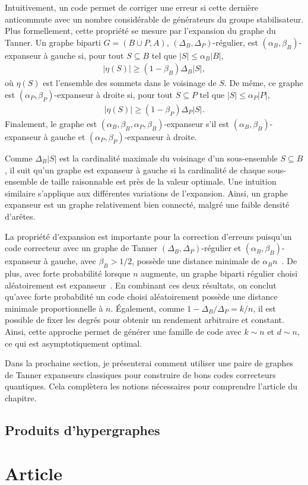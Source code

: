 Intuitivement,
un code permet de corriger une erreur si cette dernière anticommute avec un nombre 
considérable de générateurs du groupe stabilisateur.
Plus formellement,
cette propriété se mesure par l'expansion du graphe du Tanner.
Un graphe biparti $G = (B\cup P, A)$, $(\Delta_B, \Delta_P)$-régulier,
est $(\alpha_B, \beta_B)$-expanseur à gauche si,
pour tout $S \subseteq B$ tel que $|S| \leq \alpha_B |B|$,
\begin{align}
	|\eta(S)| \geq (1 - \beta_B) \Delta_B |S|,
\end{align}
où $\eta(S)$ est l'ensemble des sommets dans le voisinage de $S$.
De même,
ce graphe est $(\alpha_P, \beta_P)$-expanseur à droite si,
pour tout $S \subseteq P$ tel que $|S| \leq \alpha_P |P|$,
\begin{align}
	|\eta(S)| \geq (1 - \beta_P) \Delta_P |S|.
\end{align}
Finalement,
le graphe est $(\alpha_B, \beta_B, \alpha_P, \beta_B)$-expanseur
s'il est $(\alpha_B, \beta_B)$-expanseur à gauche
et $(\alpha_P, \beta_P)$-expanseur à droite.

Comme $\Delta_B|S|$ est la cardinalité maximale du voisinage d'un
sous-ensemble $S \subseteq B$,
il suit qu'un graphe est expanseur à gauche si la cardinalité de 
chaque sous-ensemble de taille raisonnable est près de la valeur optimale.
Une intuition similaire s'applique aux différentes variations de l'expansion.
Ainsi,
un graphe expanseur est un graphe relativement bien connecté,
malgré une faible densité d'arêtes.

La propriété d'expansion est importante pour la correction d'erreurs puisqu'un code correcteur
avec un graphe de Tanner $(\Delta_B, \Delta_P)$-régulier et $(\alpha_B, \beta_B)$-expanseur à gauche,
avec $\beta_B > 1/2$,
possède une distance minimale de $\alpha_B n$~\cite{sipser_expander_1996}.
De plus,
avec forte probabilité lorsque $n$ augmente,
un graphe biparti régulier choisi aléatoirement est expanseur~\cite{sipser_expander_1996}.
En combinant ces deux résultats,
on conclut qu'avec forte probabilité un code choisi aléatoirement possède une distance minimale
proportionnelle à $n$.
Également, comme $1 - \Delta_B / \Delta_P = k/n$,
il est possible de fixer les degrés pour obtenir un rendement arbitraire et constant.
Ainsi,
cette approche permet de générer une famille de code avec $k\sim n$ et $d \sim n$,
ce qui est asymptotiquement optimal.

Dans la prochaine section,
je présenterai comment utiliser une paire de graphes de Tanner expanseurs classiques
pour construire de bons codes correcteurs quantiques.
Cela complètera les notions nécessaires pour comprendre l'article du chapitre.

\subsection{Produits d'hypergraphes}

\section{Article}




